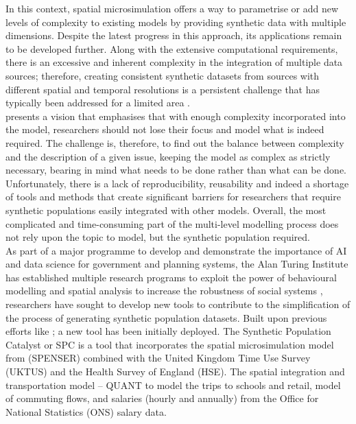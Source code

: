 \documentclass{article}
\begin{document}
\noindent In this context, spatial microsimulation offers a way to parametrise or add new levels of complexity to existing models by providing synthetic data with multiple dimensions. Despite the latest progress in this approach, its applications remain to be developed further. Along with the extensive computational requirements, there is an excessive and inherent complexity in the integration of multiple data sources; therefore, creating consistent synthetic datasets from sources with different spatial and temporal resolutions is a persistent challenge that has typically been addressed for a limited area \citep{Tanton2017}. \\

\noindent \cite{Spiekermann2018} presents a vision that emphasises that with enough complexity incorporated into the model, researchers should not lose their focus and model what is indeed required. The challenge is, therefore, to find out the balance between complexity and the description of a given issue, keeping the model as complex as strictly necessary, bearing in mind what needs to be done rather than what can be done. Unfortunately, there is a lack of reproducibility, reusability and indeed a shortage of tools and methods that create significant barriers for researchers that require synthetic populations easily integrated with other models. Overall, the most complicated and time-consuming part of the multi-level modelling process does not rely upon the topic to model, but the synthetic population required. \\

\noindent As part of a major programme to develop and demonstrate the importance of AI and data science for government and planning systems, the Alan Turing Institute has established multiple research programs to exploit the power of behavioural modelling and spatial analysis to increase the robustness of social systems \citep{UA_ATI}, researchers have sought to develop new tools to contribute to the simplification of the process of generating synthetic population datasets. Built upon previous efforts like \citep{spooner2021dynamic}; a new tool has been initially deployed. The Synthetic Population Catalyst or SPC \citep{Carlino2022} is a tool that incorporates the spatial microsimulation model from (SPENSER) combined with the United Kingdom Time Use Survey (UKTUS) and the Health Survey of England (HSE). The spatial integration and transportation model – QUANT to model the trips to schools and retail, model of commuting flows, and salaries (hourly and annually) from the Office for National Statistics (ONS) salary data.\\
\end{document}
